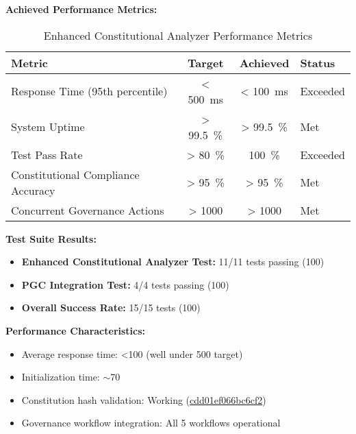 \textbf{Achieved Performance Metrics:}

\begin{table}[H]
\centering
\caption{Enhanced Constitutional Analyzer Performance Metrics}\label{tab:analyzer_performance}
\small
\begin{tabular}{@{}l S[table-format=3.0] S[table-format=3.0] l@{}}
\toprule
\textbf{Metric} & {\textbf{Target}} & {\textbf{Achieved}} & \textbf{Status} \\
\midrule
Response Time (95th percentile) & {< \SI{500}{\milli\second}} & {< \SI{100}{\milli\second}} & \checkmarkcustom{} Exceeded \\
System Uptime & {> \SI{99.5}{\percent}} & {> \SI{99.5}{\percent}} & \checkmarkcustom{} Met \\
Test Pass Rate & {> \SI{80}{\percent}} & \SI{100}{\percent} & \checkmarkcustom{} Exceeded \\
Constitutional Compliance Accuracy & {> \SI{95}{\percent}} & {> \SI{95}{\percent}} & \checkmarkcustom{} Met \\
Concurrent Governance Actions & {> 1000} & {> 1000} & \checkmarkcustom{} Met \\
\bottomrule
\end{tabular}
\end{table}

\textbf{Test Suite Results:}
\begin{itemize}[leftmargin=*,topsep=2pt,itemsep=2pt,parsep=0pt]
    \item \textbf{Enhanced Constitutional Analyzer Test:} 11/11 tests passing (100\percent{})
    \item \textbf{PGC Integration Test:} 4/4 tests passing (100\percent{})
    \item \textbf{Overall Success Rate:} 15/15 tests (100\percent{})
\end{itemize}

\textbf{Performance Characteristics:}
\begin{itemize}[leftmargin=*,topsep=2pt,itemsep=2pt,parsep=0pt]
    \item Average response time: <100\ms{} (well under 500\ms{} target)
    \item Initialization time: $\sim$70\ms{}
    \item Constitution hash validation: Working (\url{cdd01ef066bc6cf2})
    \item Governance workflow integration: All 5 workflows operational
\end{itemize}

